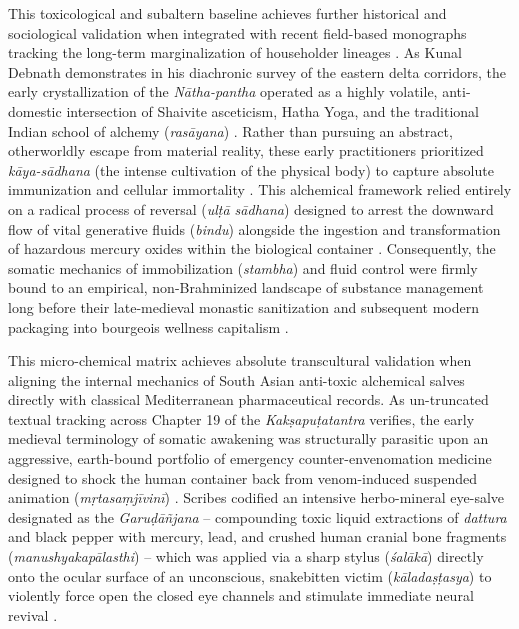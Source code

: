 \documentclass[11pt,twoside,letterpaper]{article}
\begin{document}
This toxicological and subaltern baseline achieves further historical and sociological validation when integrated with recent field-based monographs tracking the long-term marginalization of householder lineages \citep{Debnath2024}. As Kunal Debnath demonstrates in his diachronic survey of the eastern delta corridors, the early crystallization of the \textit{N\={a}tha-pantha} operated as a highly volatile, anti-domestic intersection of Shaivite asceticism, Hatha Yoga, and the traditional Indian school of alchemy (\textit{ras\={a}yana}) \citep{Debnath2024}. Rather than pursuing an abstract, otherworldly escape from material reality, these early practitioners prioritized \textit{k\={a}ya-s\={a}dhana} (the intense cultivation of the physical body) to capture absolute immunization and cellular immortality \citep{Debnath2024}. This alchemical framework relied entirely on a radical process of reversal (\textit{ul\d{t}\={a} s\={a}dhana}) designed to arrest the downward flow of vital generative fluids (\textit{bindu}) alongside the ingestion and transformation of hazardous mercury oxides within the biological container \citep{Debnath2024}. Consequently, the somatic mechanics of immobilization (\textit{stambha}) and fluid control were firmly bound to an empirical, non-Brahminized landscape of substance management long before their late-medieval monastic sanitization and subsequent modern packaging into bourgeois wellness capitalism \citep{Debnath2024, McCartney2021}.

This micro-chemical matrix achieves absolute transcultural validation when aligning the internal mechanics of South Asian anti-toxic alchemical salves directly with classical Mediterranean pharmaceutical records. As un-truncated textual tracking across Chapter 19 of the \textit{Kak\d{s}apu\d{t}atantra} verifies, the early medieval terminology of somatic awakening was structurally parasitic upon an aggressive, earth-bound portfolio of emergency counter-envenomation medicine designed to shock the human container back from venom-induced suspended animation (\textit{m\d{r}tasa\d{m}j\={i}vin\={i}}) \citep{Wujastyk2025}. Scribes codified an intensive herbo-mineral eye-salve designated as the \textit{Garu\d{d}\={a}\~{n}jana} -- compounding toxic liquid extractions of \textit{dattura} and black pepper with mercury, lead, and crushed human cranial bone fragments (\textit{manushyakap\={a}lasthi}) -- which was applied via a sharp stylus (\textit{\'sal\={a}k\={a}}) directly onto the ocular surface of an unconscious, snakebitten victim (\textit{k\={a}lada\d{s}\d{t}asya}) to violently force open the closed eye channels and stimulate immediate neural revival \citep{Mallinson2007, Wujastyk2025}. 
\end{document}
